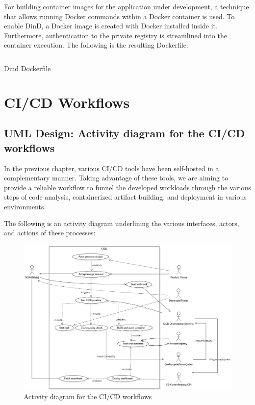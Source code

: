 
For building container images for the application under development, a technique that allows running Docker commands within a Docker container is used. To enable DinD, a Docker image is created with Docker installed inside it. Furthermore, authentication to the private registry is streamlined into the container execution. The following is the resulting Dockerfile: 

\begin{listing}[H]
    \inputminted{Dockerfile}{codeListing/dind-Dockerfile}
    \caption{Dind Dockerfile}
    \label{lst:Dind Dockerfile}
\end{listing}


\section{CI/CD Workflows}

\subsection{UML Design: Activity diagram for the CI/CD workflows } 

In the previous chapter, various CI/CD tools have been self-hosted in a complementary manner. Taking advantage of these tools, we are aiming to provide a reliable workflow to funnel the developed workloads through the various steps of code analysis, containerized artifact building, and deployment in various environments.  

 

The following is an activity diagram underlining the various interfaces, actors, and actions of these processes: 

\begin{figure}[H]\centering
\includegraphics[width=1.0\textwidth,angle=00]{assets/f45.png}
\caption{ Activity diagram for the CI/CD workflows}
\label{fig:Activity diagram for the CI/CD workflows}
\end{figure}

